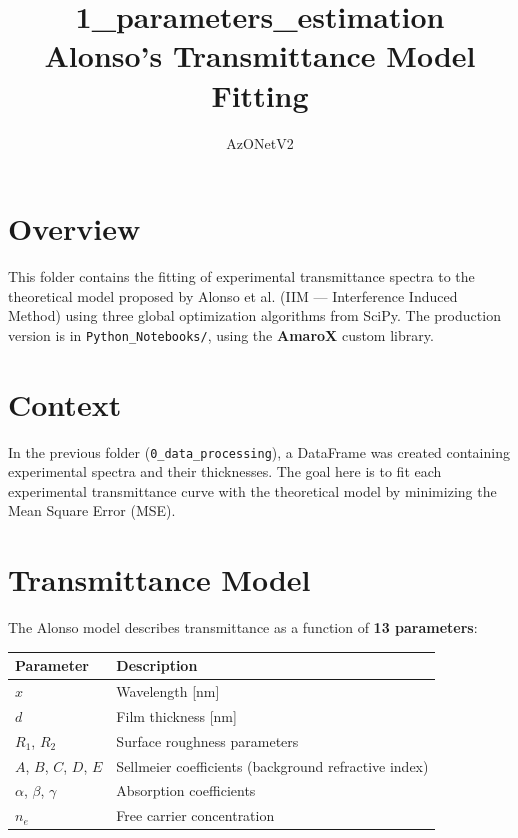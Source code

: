 \documentclass[11pt,a4paper]{article}
\title{\textbf{1\_parameters\_estimation} \\ Alonso's Transmittance Model Fitting}
\author{AzONetV2}
\date{}
\begin{document}
\maketitle

\section{Overview}

This folder contains the fitting of experimental transmittance spectra to the theoretical model proposed by Alonso et al. (IIM --- Interference Induced Method) using three global optimization algorithms from SciPy. The production version is in {\tt Python\_Notebooks/}, using the \textbf{AmaroX} custom library.

\section{Context}

In the previous folder ({\tt 0\_data\_processing}), a DataFrame was created containing experimental spectra and their thicknesses. The goal here is to fit each experimental transmittance curve with the theoretical model by minimizing the Mean Square Error (MSE).

\section{Transmittance Model}

The Alonso model describes transmittance as a function of \textbf{13 parameters}:

\begin{table}[htbp]
\centering
\begin{tabular}{ll}
\toprule
\textbf{Parameter} & \textbf{Description} \\
\midrule
$x$            & Wavelength [nm] \\
$d$            & Film thickness [nm] \\
$R_1$, $R_2$   & Surface roughness parameters \\
$A$, $B$, $C$, $D$, $E$ & Sellmeier coefficients (background refractive index) \\
$\alpha$, $\beta$, $\gamma$ & Absorption coefficients \\
$n_e$          & Free carrier concentration \\
\bottomrule
\end{tabular}
\end{table}
\end{document}
